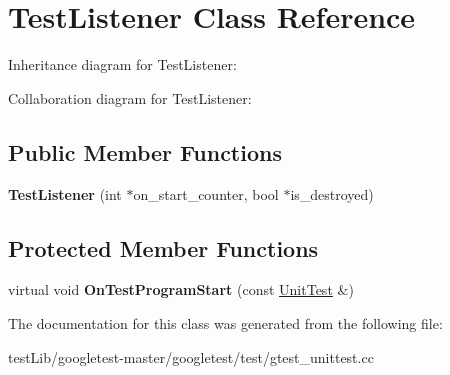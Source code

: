 \hypertarget{classTestListener}{}\section{Test\+Listener Class Reference}
\label{classTestListener}


Inheritance diagram for Test\+Listener\+:


Collaboration diagram for Test\+Listener\+:
\subsection*{Public Member Functions}
\begin{DoxyCompactItemize}
\item 
\mbox{\label{classTestListener_ab65604c6c3742c494e9378e770da5d42}} 
{\bfseries Test\+Listener} (int $\ast$on\+\_\+start\+\_\+counter, bool $\ast$is\+\_\+destroyed)
\end{DoxyCompactItemize}
\subsection*{Protected Member Functions}
\begin{DoxyCompactItemize}
\item 
\mbox{\label{classTestListener_a6218f522f5b6b37050ff0ea630ac5fd3}} 
virtual void {\bfseries On\+Test\+Program\+Start} (const \hyperlink{classtesting_1_1UnitTest}{Unit\+Test} \&)
\end{DoxyCompactItemize}


The documentation for this class was generated from the following file\+:\begin{DoxyCompactItemize}
\item 
test\+Lib/googletest-\/master/googletest/test/gtest\+\_\+unittest.\+cc\end{DoxyCompactItemize}
